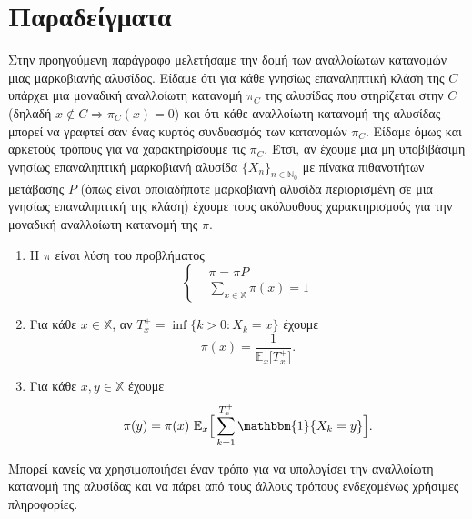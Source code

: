 \documentclass[11pt]{article}
\def\N{\mathbb{N}}
\def\X{\mathbb{X}}
\def\E{\mathbb{E}}
\def\xn{\{X_n\}_{n\in\N_0}}
\newcommand{\Ex}[1]{\E_x\big[#1\big]}
\begin{document}
\section{Παραδείγματα}
Στην προηγούμενη παράγραφο μελετήσαμε την δομή των αναλλοίωτων κατανομών μιας μαρκοβιανής αλυσίδας. Είδαμε ότι για κάθε γνησίως επαναληπτική κλάση της $C$ υπάρχει μια μοναδική αναλλοίωτη κατανομή $\pi_C$ της αλυσίδας που στηρίζεται στην $C$ (δηλαδή $x\notin C\Rightarrow \pi_C(x)=0$) και ότι κάθε αναλλοίωτη κατανομή της αλυσίδας μπορεί να γραφτεί σαν ένας κυρτός συνδυασμός των κατανομών $\pi_C$. Είδαμε όμως και αρκετούς τρόπους για να χαρακτηρίσουμε τις $\pi_C$. Έτσι, αν έχουμε μια μη υποβιβάσιμη γνησίως επαναληπτική μαρκοβιανή αλυσίδα $\xn$ με πίνακα πιθανοτήτων μετάβασης $P$ (όπως είναι οποιαδήποτε μαρκοβιανή αλυσίδα περιορισμένη σε μια γνησίως επαναληπτική της κλάση) έχουμε τους ακόλουθους χαρακτηρισμούς για την μοναδική αναλλοίωτη κατανομή της $\pi$.
\begin{enumerate}
\item
Η $\pi$ είναι λύση του προβλήματος
\[
\begin{cases} &\pi=\pi P\\&\sum_{x\in\X}\pi(x)=1\end{cases}
\]
\item Για κάθε $x\in\X$, αν $T_x^+=\inf\{k>0: X_k=x\}$ έχουμε
\[
\pi(x)=\frac{1}{\Ex{T_x^+}}.
\]
\item
Για κάθε $x,y\in\X$ έχουμε
\[
\pi(y)=\pi(x)\ \E_x\Big[\sum_{k=1}^{T_x^+}\mathbbm{1}\{X_k=y\}\Big].
\]
\end{enumerate}
Μπορεί κανείς να χρησιμοποιήσει έναν τρόπο για να υπολογίσει την αναλλοίωτη κατανομή της αλυσίδας και να πάρει από τους άλλους τρόπους  ενδεχομένως χρήσιμες πληροφορίες.
\end{document}
